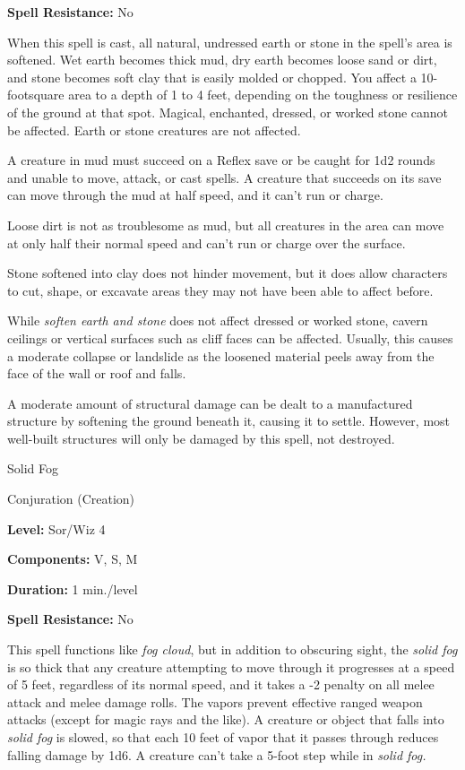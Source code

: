 \documentclass{article}
\begin{document}
\textbf{Spell Resistance:} No

When this spell is cast, all natural, undressed earth or stone in the spell's area 
is softened. Wet earth becomes thick mud, dry earth becomes loose sand or dirt, 
and stone becomes soft clay that is easily molded or chopped. You affect a 10-footsquare 
area to a depth of 1 to 4 feet, depending on the toughness or resilience of the 
ground at that spot. Magical, enchanted, dressed, or worked stone cannot be affected. 
Earth or stone creatures are not affected.

A creature in mud must succeed on a Reflex save or be caught for 1d2 rounds and 
unable to move, attack, or cast spells. A creature that succeeds on its save can 
move through the mud at half speed, and it can't run or charge.

Loose dirt is not as troublesome as mud, but all creatures in the area can move 
at only half their normal speed and can't run or charge over the surface.

Stone softened into clay does not hinder movement, but it does allow characters 
to cut, shape, or excavate areas they may not have been able to affect before.

While \textit{soften earth and stone }does not affect dressed or worked stone, 
cavern ceilings or vertical surfaces such as cliff faces can be affected. Usually, 
this causes a moderate collapse or landslide as the loosened material peels away 
from the face of the wall or roof and falls.

A moderate amount of structural damage can be dealt to a manufactured structure 
by softening the ground beneath it, causing it to settle. However, most well-built 
structures will only be damaged by this spell, not destroyed.

\vspace{12pt}
Solid Fog

Conjuration (Creation)

\textbf{Level:} Sor/Wiz 4

\textbf{Components:} V, S, M

\textbf{Duration:} 1 min./level

\textbf{Spell Resistance:} No

This spell functions like \textit{fog cloud}, but in addition to obscuring sight, 
the \textit{solid fog }is so thick that any creature attempting to move through 
it progresses at a speed of 5 feet, regardless of its normal speed, and it takes 
a -2 penalty on all melee attack and melee damage rolls. The vapors prevent effective 
ranged weapon attacks (except for magic rays and the like). A creature or object 
that falls into \textit{solid fog }is slowed, so that each 10 feet of vapor that 
it passes through reduces falling damage by 1d6. A creature can't take a 5-foot 
step while in \textit{solid fog.}
\end{document}

